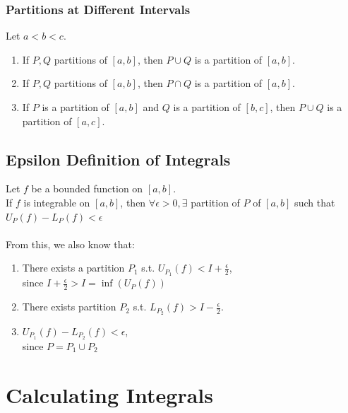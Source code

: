 \documentclass{article}
\begin{document}
\subsubsection{Partitions at Different Intervals}
Let $a < b < c$.
\begin{enumerate}
    \item If $P, Q$ partitions of $[a,b]$, then $P \cup Q$ is a partition of $[a,b]$.
    \item If $P,Q$ partitions of $[a,b]$, then $P \cap Q$ is a partition of $[a,b]$.
    \item If $P$ is a partition of $[a,b]$ and $Q$ is a partition of $[b,c]$, then $P \cup Q$ is a partition of $[a,c]$.
\end{enumerate}

\subsection{Epsilon Definition of Integrals}
Let $f$ be a bounded function on $[a,b]$.\\
If $f$ is integrable on $[a,b]$, then $\forall \epsilon > 0, \exists$ partition of $P$ of $[a,b]$ such that $U_P(f) - L_P(f) < \epsilon$\\
\\
From this, we also know that:
\begin{enumerate}
    \item There exists a partition $P_1$ s.t. $U_{P_1}(f) < I + \frac{\epsilon}{2}$,\\
    since $I + \frac{\epsilon}{2} > I = \inf(U_P(f))$
    \item There exists partition $P_2$ s.t. $L_{P_2}(f) > I - \frac{\epsilon}{2}$.
    \item $U_{P_1}(f) - L_{P_2}(f) < \epsilon$,\\
    since $P = P_1 \cup P_2$
\end{enumerate}

\section{Calculating Integrals}
\end{document}
